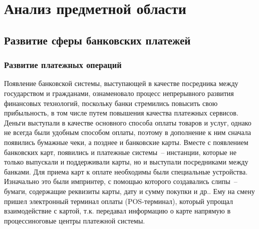 \newpage




\section{Анализ предметной области}

\subsection{Развитие сферы банковских платежей}

\subsubsection{Развитие платежных операций}

Появление банковской системы, выступающей в качестве посредника между государством и гражданами, ознаменовало процесс непрерывного развития финансовых технологий, поскольку банки стремились повысить свою прибыльность, в том числе путем повышения качества платежных сервисов.
Деньги выступали в качестве основного способа оплаты товаров и услуг, однако не всегда были удобным способом оплаты, поэтому в дополнение к ним сначала появились бумажные чеки, а позднее и банковские карты.
Вместе с появлением банковских карт, появились и платежные системы~-- инстанции, которые не только выпускали и поддерживали карты, но и выступали посредниками между банками.
Для приема карт к оплате необходимы были специальные устройства.
Изначально это были импринтер, с помощью которого создавались слипы~-- бумаги, содержащие реквизиты карты, дату и сумму покупки и др..
Ему на смену пришел электронный терминал оплаты (POS-терминал), который упрощал взаимодействие с картой, т.к. передавал информацию о карте напрямую в процессиноговые центры платежной системы.

